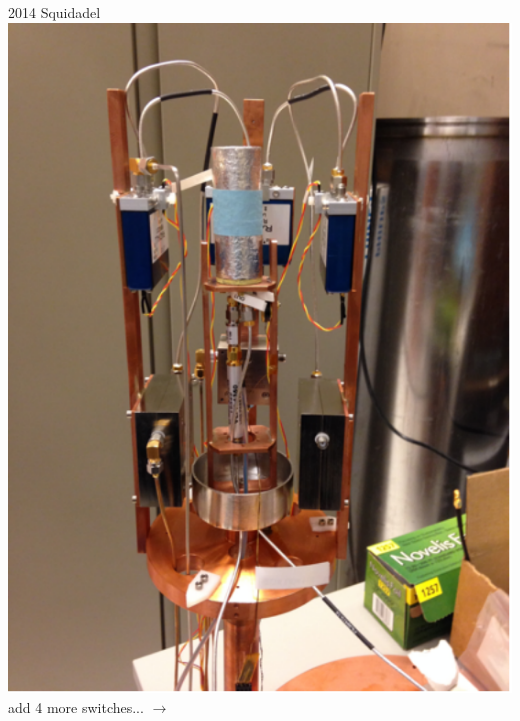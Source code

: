 \documentclass{beamer}
\begin{document}
\begin{frame}

\begin{columns}
\centering
{\color{blue} 2014 Squidadel}
\includegraphics[width=1.1\textwidth]{old_squidadel}
{\color{blue} add 4 more switches... $\rightarrow$}

\end{columns}
\end{frame}
\end{document}
